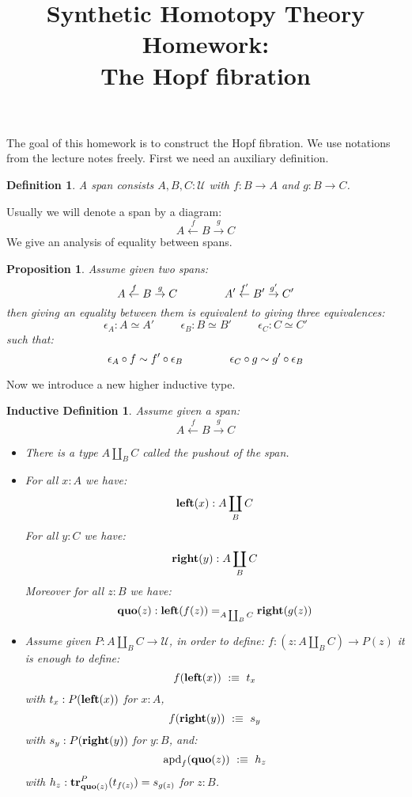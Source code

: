 \documentclass{article}[6pt]%
\title{Synthetic Homotopy Theory Homework: \\ The Hopf fibration}
\date{}
\newcommand{\U}{{\mathcal U}}
\renewcommand{\r}{\rightarrow}
\newcommand{\apd}{\mathrm{apd}}
\newcommand{\tr}{\mathrm{\bf tr}}
\newtheorem{definition}{Definition}
\newtheorem{proposition}{Proposition}
\newtheorem{ind_def}{Inductive Definition}
\newcommand{\lef}{\mathrm{\bf left}}
\newcommand{\righ}{\mathrm{\bf right}}
\newcommand{\quo}{\mathrm{\bf quo}}
\begin{document}
\maketitle



The goal of this homework is to construct the Hopf fibration. We use notations from the lecture notes freely. First we need an auxiliary definition.


\begin{definition}
A span consists $A,B,C:\U$ with $f:B\r A$ and $g:B\r C$.
\end{definition}

Usually we will denote a span by a diagram:
\[A \overset{f}{\leftarrow} B \overset{g}{\r} C\]
We give an analysis of equality between spans.

\begin{proposition}
Assume given two spans:
\[A \overset{f}{\leftarrow} B \overset{g}{\r} C \hspace{1.5cm} A' \overset{f'}{\leftarrow} B' \overset{g'}{\r} C'\]
then giving an equality between them is equivalent to giving three equivalences:
\[\epsilon_A : A \simeq A'  \hspace{1cm} \epsilon_B : B \simeq B'  \hspace{1cm} \epsilon_C : C \simeq C'\]
such that:
\[\epsilon_A \circ f \sim f'\circ \epsilon_B \hspace{1.5cm} \epsilon_C \circ g \sim g'\circ \epsilon_B\]

\end{proposition}

Now we introduce a new higher inductive type.

\begin{ind_def}
Assume given a span: 
\[A \overset{f}{\leftarrow} B \overset{g}{\r} C\]
\begin{itemize}
\item There is a type $A\coprod_B C$ called the pushout of the span.
\item For all $x:A$ we have:
\[\lef(x) : A\coprod_BC\] 
For all $y:C$ we have: 
\[\righ(y) : A\coprod_BC\] 
Moreover for all $z:B$ we have:
\[\quo(z) : \lef(f(z)) =_{A\coprod_BC} \righ(g(z))\]
\item Assume given $P : A\coprod_BC \r \U$, in order to define:
$f : (z:A\coprod_BC) \r P(z)$
it is enough to define:
\[f(\lef(x))\ :\equiv\ t_x\] 
with $t_x:P(\lef(x))$ for $x:A$, 
\[f(\righ(y))\ :\equiv\ s_y\] 
with $s_y:P(\righ(y))$ for $y:B$, and:
\[\apd_f(\quo(z)) \ :\equiv\  h_z\]
with $h_z : \tr^P_{\quo(z)} (t_{f(z)}) = s_{g(z)} $ for $z:B$.
\end{itemize}
\end{ind_def}
\end{document}
